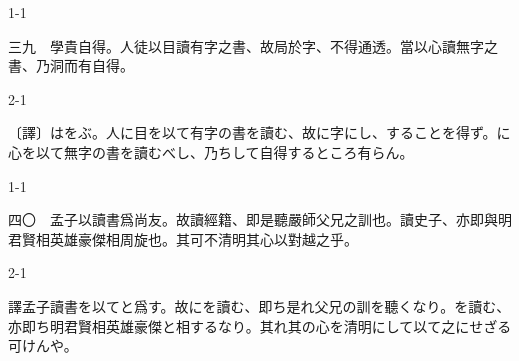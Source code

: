 \documentclass[tate,paper=b6j,jafontsize=9pt]{jlreq}
\begin{document}
\begin{azconvIndented}{1\zw}{-1\zw}

三九　學貴自得。人徒以目讀有字之書、故局於字、不得通透。當以心讀無字之書、乃洞而有自得。

\end{azconvIndented}
\begin{azconvIndented}{2\zw}{-1\zw}

〔譯〕はをぶ。人に目を以て有字の書を讀む、故に字にし、することを得ず。に心を以て無字の書を讀むべし、乃ちして自得するところ有らん。

\end{azconvIndented}

\begin{azconvIndented}{1\zw}{-1\zw}

四〇　孟子以讀書爲尚友。故讀經籍、即是聽嚴師父兄之訓也。讀史子、亦即與明君賢相英雄豪傑相周旋也。其可不清明其心以對越之乎。

\end{azconvIndented}
\begin{azconvIndented}{2\zw}{-1\zw}

譯孟子讀書を以てと爲す。故にを讀む、即ち是れ父兄の訓を聽くなり。を讀む、亦即ち明君賢相英雄豪傑と相するなり。其れ其の心を清明にして以て之にせざる可けんや。

\end{azconvIndented}
\end{document}
